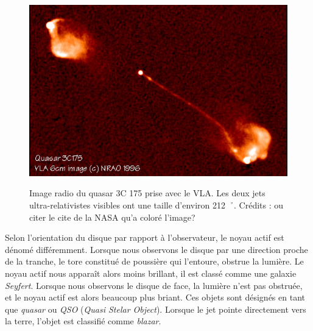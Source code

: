 \documentclass[11pt, twoside, a4paper, openright]{report}
\begin{document}
\begin{figure}[h]
  \centering
  \includegraphics[scale=0.4]{qso_jets}
  \label{fig:qso_jets}
  \caption{Image radio du quasar 3C 175 prise avec le VLA. Les deux jets ultra-relativistes visibles ont une taille d'environ \SI{212}{\per\h\kpc}. Crédits : \cite{CITE http://adsabs.harvard.edu/full/1994AJ....108..766B} ou citer le cite de la NASA qu'a coloré l'image?}
\end{figure}

Selon l'orientation du disque par rapport à l'observateur, le noyau actif est dénomé différemment. Lorsque nous observons le disque par une direction proche de la tranche, le tore constitué de poussière qui l'entoure, obstrue la lumière. Le noyau actif nous apparaît alors moins brillant, il est classé comme une galaxie \emph{Seyfert}. Lorsque nous observons le disque de face, la lumière n'est pas obstruée, et le noyau actif est alors beaucoup plus briant. Ces objets sont désignés en tant que \emph{quasar} ou \emph{QSO} (\emph{Quasi Stelar Object}). Lorsque le jet pointe directement vers la terre, l'objet est classifié comme \emph{blazar}.
\end{document}
